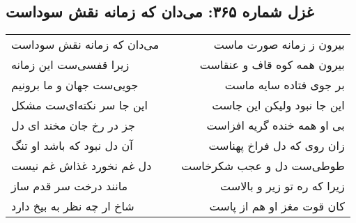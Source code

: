 \begin{center}
\section*{غزل شماره ۳۶۵: می‌دان که زمانه نقش سوداست}
\label{sec:0365}
\begin{longtable}{l p{0.5cm} r}
می‌دان که زمانه نقش سوداست
&&
بیرون ز زمانه صورت ماست
\\
زیرا قفسی‌ست این زمانه
&&
بیرون همه کوه قاف و عنقاست
\\
جویی‌ست جهان و ما برونیم
&&
بر جوی فتاده سایه ماست
\\
این جا سر نکته‌ای‌ست مشکل
&&
این جا نبود ولیکن این جاست
\\
جز در رخ جان مخند ای دل
&&
بی او همه خنده گریه افزاست
\\
آن دل نبود که باشد او تنگ
&&
زان روی که دل فراخ پهناست
\\
دل غم نخورد غذاش غم نیست
&&
طوطی‌ست دل و عجب شکرخاست
\\
مانند درخت سر قدم ساز
&&
زیرا که ره تو زیر و بالاست
\\
شاخ ار چه نظر به بیخ دارد
&&
کان قوت مغز او هم از پاست
\\
\end{longtable}
\end{center}
